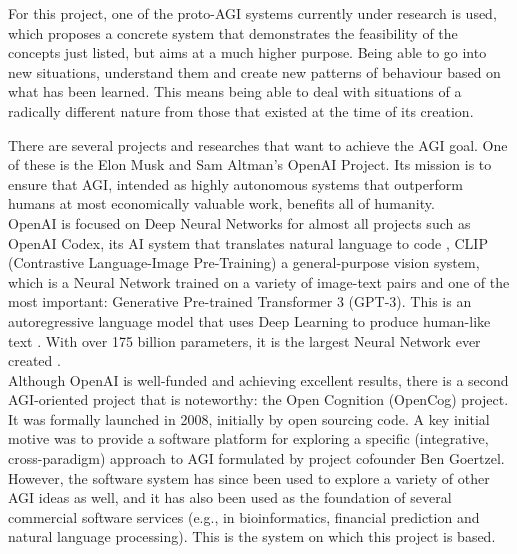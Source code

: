 For this project, one of the proto-AGI\footnotemark{} systems currently under research is used, which proposes a concrete system that demonstrates the feasibility of the concepts just listed, but aims at a much higher purpose. Being able to go into new situations, understand them and create new patterns of behaviour based on what has been learned. This means being able to deal with situations of a radically different nature from those that existed at the time of its creation. \\

There are several projects and researches that want to achieve the AGI goal. One of these is the Elon Musk and Sam Altman's OpenAI Project. 
Its mission is to ensure that AGI, intended as highly autonomous systems that outperform humans at most economically valuable work, benefits all of humanity. \\
OpenAI is focused on Deep Neural Networks for almost all projects such as OpenAI Codex, its AI system that translates natural language to code \cite{DBLP:journals/corr/abs-2107-03374}, CLIP (Contrastive Language-Image Pre-Training) a general-purpose vision system, which is a Neural Network trained on a variety of image-text pairs \cite{DBLP:journals/corr/abs-2103-00020} and one of the most important: Generative Pre-trained Transformer 3 (GPT-3). This is an autoregressive language model that uses Deep Learning to produce human-like text \cite{DBLP:journals/corr/abs-2005-14165}. With over 175 billion parameters, it is the largest Neural Network ever created \cite{romero_2021}. \\
Although OpenAI is well-funded and achieving excellent results, there is a second AGI-oriented project that is noteworthy: the Open Cognition (OpenCog) project. It was formally launched in 2008, initially by open sourcing code. A key initial motive was to provide a software platform for exploring a specific (integrative, cross-paradigm) approach to AGI formulated by project cofounder Ben Goertzel. However, the software system has since been used to explore a variety of other AGI ideas as well, and it has also been used as the foundation of several commercial software services (e.g., in bioinformatics, financial prediction and natural language processing). This is the system on which this project is based. \\

